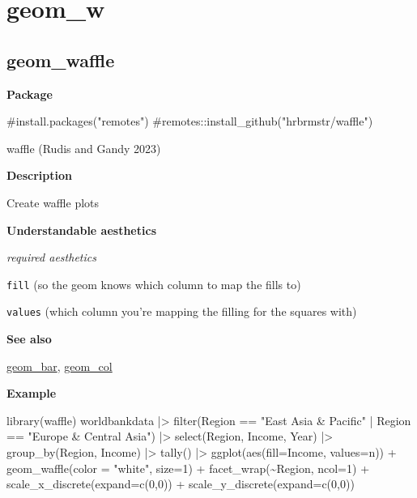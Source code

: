 \documentclass[
  letterpaper,
  DIV=11,
  numbers=noendperiod]{scrreprt}
\newenvironment{Shaded}{\begin{snugshade}}{\end{snugshade}}
\newcommand{\AttributeTok}[1]{\textcolor[rgb]{0.40,0.45,0.13}{#1}}
\newcommand{\CommentTok}[1]{\textcolor[rgb]{0.37,0.37,0.37}{#1}}
\newcommand{\DecValTok}[1]{\textcolor[rgb]{0.68,0.00,0.00}{#1}}
\newcommand{\FunctionTok}[1]{\textcolor[rgb]{0.28,0.35,0.67}{#1}}
\newcommand{\NormalTok}[1]{\textcolor[rgb]{0.00,0.23,0.31}{#1}}
\newcommand{\SpecialCharTok}[1]{\textcolor[rgb]{0.37,0.37,0.37}{#1}}
\newcommand{\StringTok}[1]{\textcolor[rgb]{0.13,0.47,0.30}{#1}}
\begin{document}
\chapter{geom\_w}\label{sec-w}

\section{geom\_waffle}\label{geom_waffle}

\textbf{Package}

\begin{Shaded}
\begin{Highlighting}[]
\CommentTok{\#install.packages("remotes")}
\CommentTok{\#remotes::install\_github("hrbrmstr/waffle")}
\end{Highlighting}
\end{Shaded}

waffle (Rudis and Gandy 2023)

\textbf{Description}

Create waffle plots

\textbf{Understandable aesthetics}

\emph{required aesthetics}

\texttt{fill} (so the geom knows which column to map the fills to)

\texttt{values} (which column you're mapping the filling for the squares
with)

\textbf{See also}

\hyperref[bar]{geom\_bar}, \hyperref[col]{geom\_col}

\textbf{Example}

\begin{Shaded}
\begin{Highlighting}[]
\FunctionTok{library}\NormalTok{(waffle)}
\NormalTok{worldbankdata }\SpecialCharTok{|\textgreater{}}
  \FunctionTok{filter}\NormalTok{(Region }\SpecialCharTok{==} \StringTok{"East Asia \& Pacific"} \SpecialCharTok{|}\NormalTok{ Region }\SpecialCharTok{==} \StringTok{"Europe \& Central Asia"}\NormalTok{) }\SpecialCharTok{|\textgreater{}}
  \FunctionTok{select}\NormalTok{(Region, Income, Year) }\SpecialCharTok{|\textgreater{}}
  \FunctionTok{group\_by}\NormalTok{(Region, Income) }\SpecialCharTok{|\textgreater{}}
  \FunctionTok{tally}\NormalTok{() }\SpecialCharTok{|\textgreater{}}
  \FunctionTok{ggplot}\NormalTok{(}\FunctionTok{aes}\NormalTok{(}\AttributeTok{fill=}\NormalTok{Income, }\AttributeTok{values=}\NormalTok{n)) }\SpecialCharTok{+}
  \FunctionTok{geom\_waffle}\NormalTok{(}\AttributeTok{color =} \StringTok{"white"}\NormalTok{, }\AttributeTok{size=}\DecValTok{1}\NormalTok{) }\SpecialCharTok{+}
  \FunctionTok{facet\_wrap}\NormalTok{(}\SpecialCharTok{\textasciitilde{}}\NormalTok{Region, }\AttributeTok{ncol=}\DecValTok{1}\NormalTok{) }\SpecialCharTok{+}
  \FunctionTok{scale\_x\_discrete}\NormalTok{(}\AttributeTok{expand=}\FunctionTok{c}\NormalTok{(}\DecValTok{0}\NormalTok{,}\DecValTok{0}\NormalTok{)) }\SpecialCharTok{+}
  \FunctionTok{scale\_y\_discrete}\NormalTok{(}\AttributeTok{expand=}\FunctionTok{c}\NormalTok{(}\DecValTok{0}\NormalTok{,}\DecValTok{0}\NormalTok{)) }
\end{Highlighting}
\end{Shaded}
\end{document}
